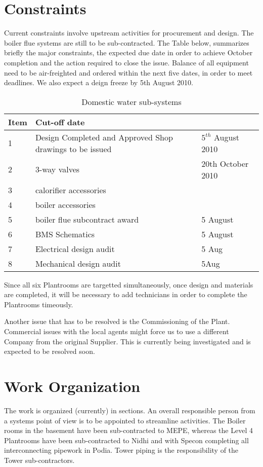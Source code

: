 \section{Constraints}

Current constraints involve upstream activities for procurement and design. The boiler flue systems are still to be sub-contracted. The Table below, summarizes briefly the major constraints, the expected due date in order to achieve October completion and the action required to close the issue. Balance of all equipment need to be air-freighted and ordered within the next five dates, in order to meet deadlines. We also expect a deign freeze by 5th August 2010.


           \begin{table}[htbp] 
	    \begin{tabular}{l p{4cm}l}
	      \toprule
	     Item & Cut-off date  \\
	      \midrule
	      1  &Design Completed and Approved Shop drawings to be issued             &  $5^{th}$ August 2010  \\
 	      2  &3-way valves       &  20th October 2010  \\
                  3  &calorifier accessories & \\
                  4  &boiler accessories      & \\
                  5  &boiler flue subcontract award & 5 August\\
                  6  &BMS Schematics & 5 August \\
                  7 &Electrical design audit & 5 Aug\\
                  8 &Mechanical design audit &5Aug \\
	      \bottomrule
	    \end{tabular}
           \caption{Domestic water sub-systems}
            \end{table}

Since all six Plantrooms are targetted simultaneously, once design and materials are completed, it will be necessary to add technicians in order to complete the Plantrooms timeously.

Another issue that has to be resolved is the Commissioning of the Plant. Commercial issues with the local agents might force us to use a different Company from the original Supplier. This is currently being investigated and is expected to be resolved soon.

\section{Work Organization}
The work is organized (currently) in sections. An overall responsible person from a systems point of view is to be appointed to streamline activities. The Boiler rooms in the basement have been sub-contracted to MEPE, whereas the Level 4 Plantrooms have been sub-contracted to Nidhi and with Specon completing all interconnecting pipework in Podia. Tower piping is the responsibility of the Tower sub-contractors.


